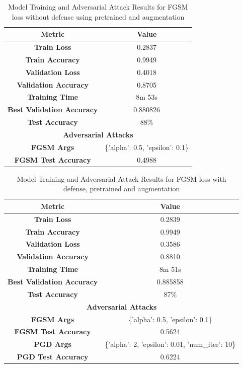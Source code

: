 \documentclass{article}
\begin{document}
\begin{table}[H]
    \centering
    \begin{tabular}{|c|c|}
    \hline
    \textbf{Metric} & \textbf{Value} \\
    \hline
    \textbf{Train Loss} & 0.2837 \\
    \textbf{Train Accuracy} & 0.9949 \\
    \hline
    \textbf{Validation Loss} & 0.4018 \\
    \textbf{Validation Accuracy} & 0.8705 \\
    \hline
    \textbf{Training Time} & 8m 53s \\
    \hline
    \textbf{Best Validation Accuracy} & 0.880826 \\
    \hline
    \textbf{Test Accuracy} & 88\% \\
    \hline
    \multicolumn{2}{|c|}{\textbf{Adversarial Attacks}} \\
    \hline
    \textbf{FGSM Args} & \{'alpha': 0.5, 'epsilon': 0.1\} \\
    \textbf{FGSM Test Accuracy} & 0.4988 \\
    \hline
    \end{tabular}
    \caption{Model Training and Adversarial Attack Results for FGSM loss without defense using pretrained and augmentation}
\end{table}

\begin{table}[H]
    \centering
    \begin{tabular}{|c|c|}
    \hline
    \textbf{Metric} & \textbf{Value} \\
    \hline
    \textbf{Train Loss} & 0.2839 \\
    \textbf{Train Accuracy} & 0.9949 \\
    \hline
    \textbf{Validation Loss} & 0.3586 \\
    \textbf{Validation Accuracy} & 0.8810 \\
    \hline
    \textbf{Training Time} & 8m 51s \\
    \hline
    \textbf{Best Validation Accuracy} & 0.885858 \\
    \hline
    \textbf{Test Accuracy} & 87\% \\
    \hline
    \multicolumn{2}{|c|}{\textbf{Adversarial Attacks}} \\
    \hline
    \textbf{FGSM Args} & \{'alpha': 0.5, 'epsilon': 0.1\} \\
    \textbf{FGSM Test Accuracy} & 0.5624 \\
    \hline
    \textbf{PGD Args} & \{'alpha': 2, 'epsilon': 0.01, 'num\_iter': 10\} \\
    \textbf{PGD Test Accuracy} & 0.6224 \\
    \hline
    \end{tabular}
    \caption{Model Training and Adversarial Attack Results for FGSM loss with defense, pretrained and augmentation}
\end{table}
\end{document}
